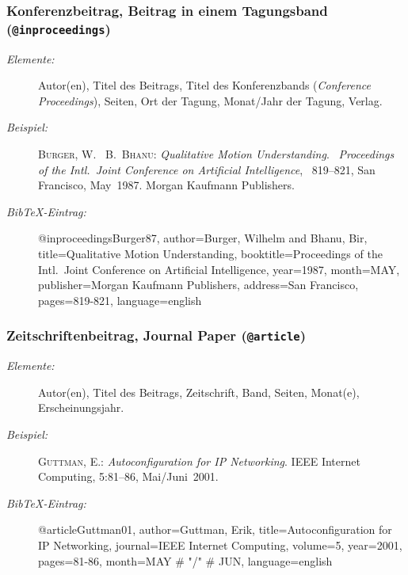 \subsubsection{Konferenzbeitrag, Beitrag in einem Tagungsband (\texttt{@inproceedings})}
\nocite{Burger87}

\begin{description}
\item[\it Elemente:] \hfill\break
  Autor(en), Titel des Beitrags, Titel des Konferenzbands (\emph{Conference
  Proceedings}), Seiten,
  Ort der Tagung, Monat/Jahr der Tagung, Verlag.
\item[\it Beispiel:] \hfill\break
\textsc{Burger, W.} \ \textsc{B.~Bhanu}: \emph{Qualitative Motion
  Understanding}.
\newblock {}\ \emph{Proceedings of the Intl.\ Joint Conference on
  Artificial Intelligence}, \ 819--821, San Francisco,
  May\ 1987. Morgan Kaufmann Publishers.
\item[\it BibTeX-Eintrag:] \mbox{}\par
%
\begin{GenericCode}
@inproceedings{Burger87,
  author={Burger, Wilhelm and Bhanu, Bir},
  title={Qualitative Motion Understanding},
  booktitle={Proceedings of the Intl.\ Joint Conference
	           on Artificial Intelligence},
  year={1987},
  month=MAY,
  publisher={Morgan Kaufmann Publishers},
  address={San Francisco},
  pages={819-821},
  language={english}
}
\end{GenericCode}
\end{description}

\subsubsection{Zeitschriftenbeitrag, Journal Paper (\texttt{@article})}
\nocite{Guttman01}

\begin{description}

\item[\it Elemente:] \hfill\break
    Autor(en), Titel des Beitrags, Zeitschrift, Band, Seiten, Monat(e),
    Erscheinungsjahr.
\item[\it Beispiel:] \hfill\break
\textsc{Guttman, E.}: \emph{Autoconfiguration for {IP} Networking}.
\newblock IEEE Internet Computing, 5:81--86, Mai/Juni\ 2001.
\item[\it BibTeX-Eintrag:] \mbox{}\par
%
\begin{GenericCode}
@article{Guttman01,
  author={Guttman, Erik},
  title={Autoconfiguration for {IP} Networking},
  journal={IEEE Internet Computing},
  volume={5},
  year={2001},
  pages={81-86},
  month=MAY # "/" # JUN,
  language={english}
}
\end{GenericCode}
\end{description}

